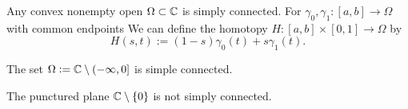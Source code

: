 \documentclass[11pt,a4paper]{article}
\begin{document}
\begin{example}
  \label{exmp:open-convex-is-simply-connected}
  Any convex nonempty open $\Omega \subset \mathbb{C}$ is simply connected.
  For $\gamma_0, \gamma_1 \colon [a,b] \to \Omega$ with common endpoints
  We can define the homotopy $H \colon [a,b] \times [0,1] \to \Omega$ by
  \[
    H(s,t) := (1 - s) \gamma_0(t) + s \gamma_1(t).
  \]
\end{example}
\begin{example}
  \label{exmp:principle-branch}
  The set $\Omega := \mathbb{C} \setminus (-\infty,0]$ is simple connected.
\end{example}
\begin{example}
  \label{exmp:punctured-plane}
  The punctured plane $\mathbb{C} \setminus \left\{0\right\}$ is not simply connected.
\end{example}
\end{document}
